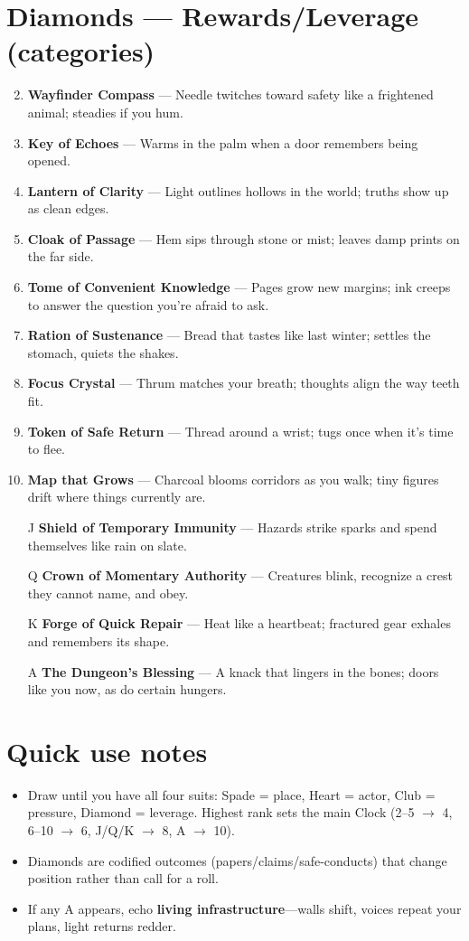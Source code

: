 \section*{Diamonds --- Rewards/Leverage (categories)}
\label{sec:dungeon-rewards}
\begin{enumerate}
\setcounter{enumi}{1}
\item \textbf{Wayfinder Compass} --- Needle twitches toward safety like a frightened animal; steadies if you hum.
\item \textbf{Key of Echoes} --- Warms in the palm when a door remembers being opened.
\item \textbf{Lantern of Clarity} --- Light outlines hollows in the world; truths show up as clean edges.
\item \textbf{Cloak of Passage} --- Hem sips through stone or mist; leaves damp prints on the far side.
\item \textbf{Tome of Convenient Knowledge} --- Pages grow new margins; ink creeps to answer the question you're afraid to ask.
\item \textbf{Ration of Sustenance} --- Bread that tastes like last winter; settles the stomach, quiets the shakes.
\item \textbf{Focus Crystal} --- Thrum matches your breath; thoughts align the way teeth fit.
\item \textbf{Token of Safe Return} --- Thread around a wrist; tugs once when it's time to flee.
\item \textbf{Map that Grows} --- Charcoal blooms corridors as you walk; tiny figures drift where things currently are.
\item[J] \textbf{Shield of Temporary Immunity} --- Hazards strike sparks and spend themselves like rain on slate.
\item[Q] \textbf{Crown of Momentary Authority} --- Creatures blink, recognize a crest they cannot name, and obey.
\item[K] \textbf{Forge of Quick Repair} --- Heat like a heartbeat; fractured gear exhales and remembers its shape.
\item[A] \textbf{The Dungeon's Blessing} --- A knack that lingers in the bones; doors like you now, as do certain hungers.
\end{enumerate}

\section*{Quick use notes}
\label{sec:dungeon-quick-use}
\begin{itemize}
\item Draw until you have all four suits: Spade = place, Heart = actor, Club = pressure, Diamond = leverage. Highest rank sets the main Clock (2--5 $\rightarrow$ 4, 6--10 $\rightarrow$ 6, J/Q/K $\rightarrow$ 8, A $\rightarrow$ 10).
\item Diamonds are codified outcomes (papers/claims/safe-conducts) that change position rather than call for a roll.
\item If any A appears, echo \textbf{living infrastructure}---walls shift, voices repeat your plans, light returns redder.
\end{itemize}

